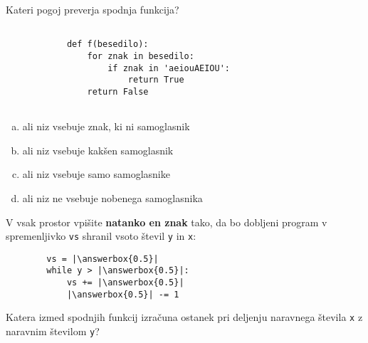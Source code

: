 \documentclass[arhiv, 10pt]{../izpit}
\newcommand{\inlinepy}[1]{\texttt{#1}}
\newcommand{\answerbox}[1]{\framebox{\vphantom{\large M}\hspace{#1cm}}}
\begin{document}
        \naloga*

        \begin{multicols}{2}
        \noindent
        Kateri pogoj preverja spodnja funkcija?
        \begin{verbatim}
        
            def f(besedilo):
                for znak in besedilo:
                    if znak in 'aeiouAEIOU':
                        return True
                return False
            
        \end{verbatim}

        \begin{enumerate}[(a)]
\item ali niz vsebuje znak, ki ni samoglasnik
\item ali niz vsebuje kakšen samoglasnik
\item ali niz vsebuje samo samoglasnike
\item ali niz ne vsebuje nobenega samoglasnika
\end{enumerate}

        \end{multicols}
    
        \naloga*
        \begin{multicols}{2}
        \noindent
        V vsak prostor vpišite \textbf{natanko en znak} tako, da bo dobljeni program v spremenljivko \inlinepy{vs} shranil vsoto števil \inlinepy{y} in \inlinepy{x}:
        
        \columnbreak
        \begin{verbatim}
        vs = |\answerbox{0.5}|
        while y > |\answerbox{0.5}|:
            vs += |\answerbox{0.5}|
            |\answerbox{0.5}| -= 1
        \end{verbatim}
        \end{multicols}
    
        \clearpage
        \naloga
        
        Katera izmed spodnjih funkcij izračuna ostanek pri deljenju naravnega števila \inlinepy{x} z naravnim številom \inlinepy{y}?
    
\end{document}
